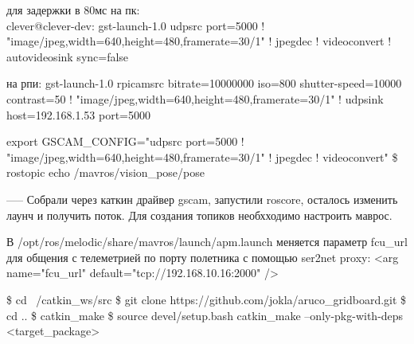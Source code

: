 для задержки в 80мс на пк:\\
clever@clever-dev: gst-launch-1.0 udpsrc port=5000 ! "image/jpeg,width=640,height=480,framerate=30/1" ! jpegdec ! videoconvert ! autovideosink sync=false

на рпи:
gst-launch-1.0 rpicamsrc bitrate=10000000 iso=800 shutter-speed=10000 contrast=50 ! "image/jpeg,width=640,height=480,framerate=30/1" ! udpsink host=192.168.1.53 port=5000

export GSCAM_CONFIG="udpsrc port=5000 ! "image/jpeg,width=640,height=480,framerate=30/1" ! jpegdec ! videoconvert"
\$ rostopic echo /mavros/vision_pose/pose

-----
Собрали через каткин драйвер gscam, запустили roscore, осталось изменить лаунч и получить поток.
Для создания топиков необхходимо настроить маврос.

В /opt/ros/melodic/share/mavros/launch/apm.launch меняется параметр fcu\_url для общения с телеметрией по порту полетника с помощью ser2net proxy:
<arg name="fcu\_url" default="tcp://192.168.10.16:2000" />

\$ cd ~/catkin\_ws/src
\$ git clone https://github.com/jokla/aruco\_gridboard.git
\$ cd ..
\$ catkin\_make
\$ source devel/setup.bash
catkin\_make --only-pkg-with-deps <target\_package>

